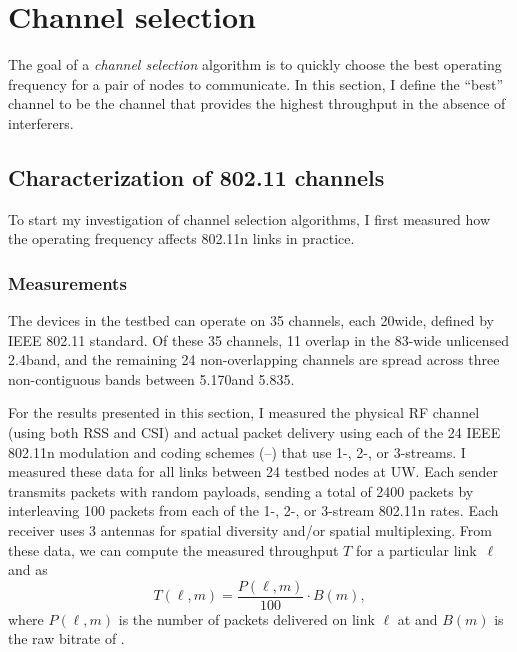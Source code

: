 \section{Channel selection}\label{sec:esnr_chansel}
The goal of a \emph{channel selection} algorithm is to quickly choose the best operating frequency for a pair of nodes to communicate. In this section, I define the ``best'' channel to be the channel that provides the highest throughput in the absence of interferers.

\subsection{Characterization of 802.11 channels}
To start my investigation of channel selection algorithms, I first measured how the operating frequency affects 802.11n links in practice.

\subsubsection{Measurements}
\label{sec:chan_sel_data}
The  devices in the testbed can operate on 35 channels, each 20\MHz wide, defined by IEEE 802.11 standard. Of these 35 channels, 11 overlap in the 83-\MHz wide unlicensed 2.4\GHz band, and the remaining 24 non-overlapping channels are spread across three non-contiguous bands between 5.170\GHz and 5.835\GHz.

For the results presented in this section, I measured the physical RF channel (using both RSS and CSI) and actual packet delivery using each of the 24 IEEE 802.11n modulation and coding schemes (--) that use  1-, 2-, or 3-streams. I measured these data for all links between 24 testbed nodes at UW\@. Each sender transmits packets with random payloads, sending a total of 2400 packets by interleaving 100 packets from each of the 1-, 2-, or 3-stream 802.11n rates. Each receiver uses 3 antennas for spatial diversity and/or spatial multiplexing. From these data, we can compute the measured throughput $T$ for a particular link~$\ell$ and  as
\begin{equation}
	\label{eq:prr_throughput}
	T(\ell,m) = \frac{P(\ell,m)}{100} \cdot B(m),
\end{equation}
where $P(\ell,m)$ is the number of packets delivered on link $\ell$ at  and $B(m)$ is the raw bitrate of .

